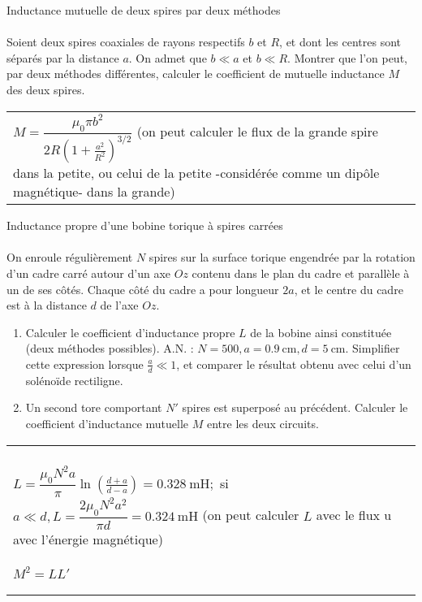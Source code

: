 \documentclass[french, a4paper, 11pt]{article}
\begin{document}
\begin{cadre}{Inductance mutuelle de deux spires par deux méthodes}
  \paragraph*{}
  Soient deux spires coaxiales de rayons respectifs \(b\) et \(R\), et dont les centres sont séparés par la distance \(a\).
  On admet que \(b \ll a\) et \(b \ll R\). Montrer que l'on peut, par deux méthodes différentes, calculer le coefficient
  de mutuelle inductance \(M\) des deux spires.

  \tcblower
  \begin{tabularx}{\linewidth}{Xr}
  \(M=\dfrac{\mu_0\pi b^2}{2R\left(1+\frac{a^2}{R^2}\right)^{3/2}}\) (on peut calculer le flux de la grande spire dans la
  petite, ou celui de la petite -considérée comme un dipôle magnétique- dans la grande)
  \end{tabularx}
\end{cadre}

\begin{cadre}{Inductance propre d'une bobine torique à spires carrées}
  \paragraph*{}
  On enroule régulièrement \(N\) spires sur la surface torique engendrée par la rotation d'un cadre
  carré autour d'un axe \(Oz\) contenu dans le plan du cadre et parallèle à un de ses côtés.
  Chaque côté du cadre a pour longueur \(2a\), et le centre du cadre est à la distance \(d\) de l'axe \(Oz\).
  \begin{enumerate}[label=\upshape\alph*)]
    \item Calculer le coefficient d'inductance propre \(L\) de la bobine ainsi constituée
  (deux méthodes possibles). A.N. : \(N=500, a=\SI{0.9}{\centi\metre}, d=\SI{5}{\centi\metre}\).
  Simplifier cette expression lorsque \(\frac{a}{d} \ll 1\), et comparer le résultat obtenu avec celui d'un solénoïde rectiligne.
    \item Un second tore comportant \(N'\) spires est superposé au précédent. Calculer le coefficient d'inductance mutuelle \(M\)
  entre les deux circuits.
  \end{enumerate}

  \tcblower
  \begin{tabularx}{\linewidth}{Xr}
    \paragraph*{}
    \(L=\dfrac{\mu_0N^2a}{\pi}\ln\left(\frac{d+a}{d-a}\right)=\SI{0.328}{\milli\henry};\)
    si \(a \ll d, L=\dfrac{2\mu_0N^2a^2}{\pi d}=\SI{0.324}{\milli\henry}\)
    (on peut calculer \(L\) avec le flux u avec l'énergie magnétique)
    \paragraph*{}
    \(M^2=LL'\)
  \end{tabularx}
\end{cadre}
\end{document}
